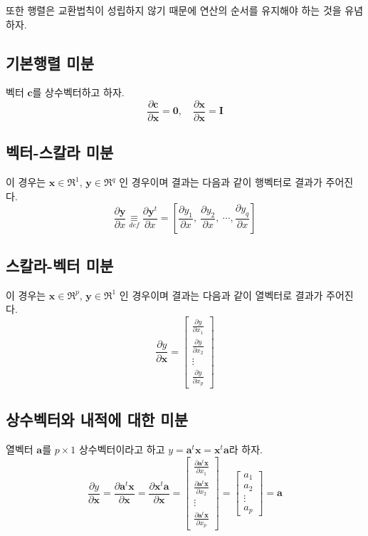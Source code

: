 \documentclass[
]{book}
\newcommand{\pardiff}[2]{\frac{\partial #1}{\partial #2 }}
\theoremstyle{definition}
\theoremstyle{definition}
\theoremstyle{definition}
\theoremstyle{remark}
\begin{document}
또한 행렬은 교환법칙이 성립하지 않기 때문에 연산의 순서를 유지해야 하는 것을 유념하자.

\hypertarget{uxae30uxbcf8uxd589uxb82c-uxbbf8uxbd84}{%
\subsection{기본행렬 미분}\label{uxae30uxbcf8uxd589uxb82c-uxbbf8uxbd84}}

벡터 \(\bm c\)를 상수벡터하고 하자.
\[ \pardiff{\bm c}{ \bm x} = \bm 0, \quad \pardiff{\bm x}{ \bm x} = \bm I \]

\hypertarget{uxbca1uxd130-uxc2a4uxce7cuxb77c-uxbbf8uxbd84}{%
\subsection{벡터-스칼라 미분}\label{uxbca1uxd130-uxc2a4uxce7cuxb77c-uxbbf8uxbd84}}

이 경우는 \(\bm x \in \Re^1\), \(\bm y \in \Re^q\) 인 경우이며 결과는 다음과 같이 행벡터로 결과가 주어진다.
\[
\pardiff{ \bm y}{ x} \underset{def}{\equiv}  \pardiff{ \bm y^t}{ x}
= \left [ \pardiff{  y_1}{ x}, ~ \pardiff{  y_2}{ x},~   \cdots, \pardiff{  y_q}{ x} \right ]
\]

\hypertarget{uxc2a4uxce7cuxb77c-uxbca1uxd130-uxbbf8uxbd84}{%
\subsection{스칼라-벡터 미분}\label{uxc2a4uxce7cuxb77c-uxbca1uxd130-uxbbf8uxbd84}}

이 경우는 \(\bm x \in \Re^p\), \(\bm y \in \Re^1\) 인 경우이며 결과는 다음과 같이 열벡터로 결과가 주어진다.
\[
\pardiff{ y}{\bm x}
= \begin{bmatrix}
\pardiff{  y}{ x_1} \\
\pardiff{  y}{ x_2} \\
\vdots     \\
\pardiff{  y}{ x_p}
\end{bmatrix}
\]

\hypertarget{uxc0c1uxc218uxbca1uxd130uxc640-uxb0b4uxc801uxc5d0-uxb300uxd55c-uxbbf8uxbd84}{%
\subsection{상수벡터와 내적에 대한 미분}\label{uxc0c1uxc218uxbca1uxd130uxc640-uxb0b4uxc801uxc5d0-uxb300uxd55c-uxbbf8uxbd84}}

열벡터 \(\bm a\)를 \(p \times 1\) 상수벡터이라고 하고 \(y = \bm a^t \bm x = \bm x^t \bm a\)라 하자.
\[
\pardiff{ y}{\bm x}  = \pardiff{ \bm a^t \bm x}{\bm x}   =\pardiff{\bm x^t \bm a}{\bm x}
= \begin{bmatrix}
\pardiff{  \bm a^t \bm x}{ x_1} \\
\pardiff{  \bm a^t \bm x}{ x_2} \\
\vdots     \\
\pardiff{  \bm a^t \bm x}{ x_p}
\end{bmatrix}
= \begin{bmatrix}
a_1 \\
a_2 \\
\vdots     \\
a_p
\end{bmatrix}
= \bm a
\]
\end{document}
